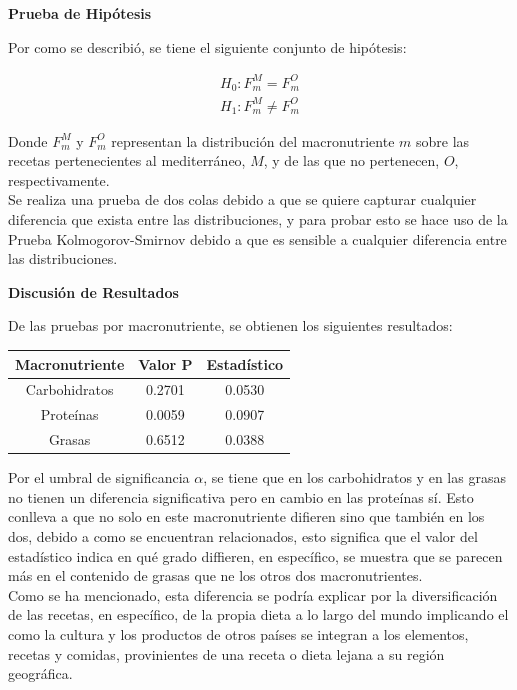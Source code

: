 \documentclass[12pt,a4paper]{article}
\begin{document}
        \textbf{Prueba de Hipótesis}\\
        {
            Por como se describió, se tiene el siguiente conjunto de hipótesis:

            \begin{align*}
                H_0 : F^M_m = F^O_m \\
                H_1 : F^M_m \ne F^O_m  
            \end{align*}

            Donde $F^M_m$ y $F^O_m$ representan la distribución del macronutriente $m$ sobre las 
            recetas pertenecientes al mediterráneo, $M$, y de las que no pertenecen, $O$, respectivamente.\\ 

            Se realiza una prueba de dos colas debido a que se quiere capturar cualquier diferencia 
            que exista entre las distribuciones,  y para probar esto se hace uso de la Prueba Kolmogorov-Smirnov 
            debido a que es sensible a cualquier diferencia entre las distribuciones.
        }

        \textbf{Discusión de Resultados}\\
        {
            De las pruebas por macronutriente, se obtienen los siguientes resultados:

            \begin{center}
                \begin{tabular}{| c | c | c |}
                    \toprule
                    \textbf{Macronutriente} & \textbf{Valor P} & \textbf{Estadístico} \\
                    \midrule
                    Carbohidratos & 0.2701 & 0.0530 \\
                    Proteínas     & 0.0059 & 0.0907 \\
                    Grasas        & 0.6512 & 0.0388 \\
                    \bottomrule
                \end{tabular}
            \end{center}

            Por el umbral de significancia $\alpha$, se tiene que en los carbohidratos y en las 
            grasas no tienen un diferencia significativa pero en cambio en las proteínas sí. Esto 
            conlleva a que no solo en este macronutriente difieren sino que también en los dos, debido 
            a como se encuentran relacionados, esto significa que el valor del estadístico indica en qué 
            grado diffieren, en específico, se muestra que se parecen más en el contenido de grasas que ne 
            los otros dos macronutrientes. \\

            Como se ha mencionado, esta diferencia se podría explicar por la diversificación de las recetas, 
            en específico, de la propia dieta a lo largo del mundo implicando el como la cultura y los productos 
            de otros países se integran a los elementos, recetas y comidas, provinientes de una receta o dieta lejana 
            a su región geográfica.\\
        }
\end{document}
